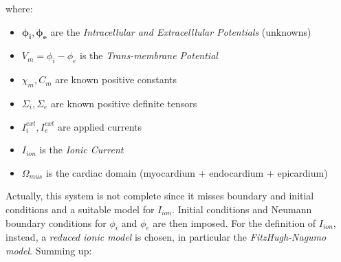\documentclass[a4paper,11pt]{article}
\begin{document}
	where:
	\begin{itemize}[label=\textendash]
		\item $\bm{\phi_i, \phi_e}$ are the \emph{Intracellular and Extracelllular Potentials} (unknowns)
		\item $V_m = \phi_i-\phi_e$ is the \emph{Trans-membrane Potential}
		\item $\chi_m,C_m$ are known positive constants
		\item $\Sigma_i, \Sigma_e$ are known positive definite tensors 
		\item $I_i^{ext},I_e^{ext}$ are applied currents
		\item $I_{ion}$ is the \emph{Ionic Current}
		\item $\Omega_{mus}$ is the cardiac domain (myocardium + endocardium + epicardium)
	\end{itemize}
    
    \vspace{4mm}
    \noindent Actually, this system is not complete since it misses boundary and initial conditions and a suitable model for $I_{ion}$. Initial conditions and Neumann boundary conditions for $\phi_i$ and $\phi_e$ are then imposed. For the definition of $I_{ion}$, instead, a \emph{reduced ionic model} is chosen, in particular the \emph{FitzHugh-Nagumo model}. Summing up:
    
\end{document}
